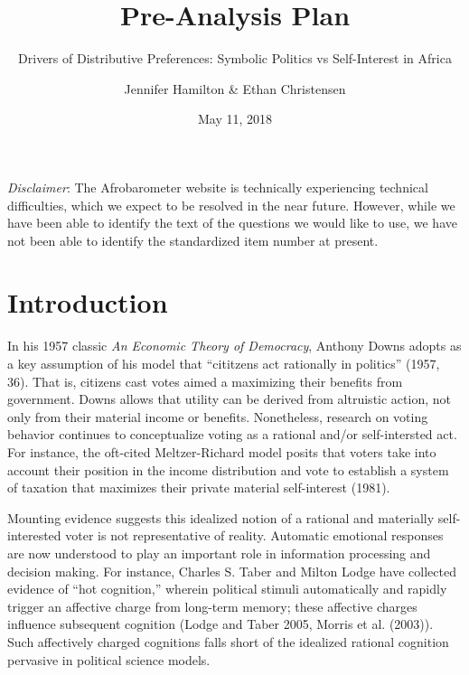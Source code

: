 \documentclass[]{article}
\title{Pre-Analysis Plan}
\subtitle{Drivers of Distributive Preferences: Symbolic Politics vs Self-Interest
in Africa}
\author{Jennifer Hamilton \& Ethan Christensen}
\date{May 11, 2018}
\begin{document}
\maketitle

\textit{Disclaimer}: The Afrobarometer website is technically
experiencing technical difficulties, which we expect to be resolved in
the near future. However, while we have been able to identify the text
of the questions we would like to use, we have not been able to identify
the standardized item number at present.

\section{Introduction}\label{introduction}

In his 1957 classic \textit{An Economic Theory of Democracy}, Anthony
Downs adopts as a key assumption of his model that ``cititzens act
rationally in politics'' (1957, 36). That is, citizens cast votes aimed
a maximizing their benefits from government. Downs allows that utility
can be derived from altruistic action, not only from their material
income or benefits. Nonetheless, research on voting behavior continues
to conceptualize voting as a rational and/or self-intersted act. For
instance, the oft-cited Meltzer-Richard model posits that voters take
into account their position in the income distribution and vote to
establish a system of taxation that maximizes their private material
self-interest (1981).

Mounting evidence suggests this idealized notion of a rational and
materially self-interested voter is not representative of reality.
Automatic emotional responses are now understood to play an important
role in information processing and decision making. For instance,
Charles S. Taber and Milton Lodge have collected evidence of ``hot
cognition,'' wherein political stimuli automatically and rapidly trigger
an affective charge from long-term memory; these affective charges
influence subsequent cognition (Lodge and Taber 2005, Morris et al.
(2003)). Such affectively charged cognitions falls short of the
idealized rational cognition pervasive in political science models.
\end{document}
